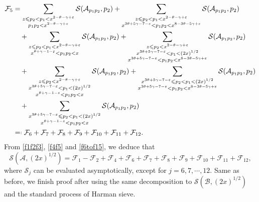 \documentclass[12pt, reqno, twoside, letterpaper]{amsart}
\numberwithin{equation}{section}
\newcommand{\cA}{\ensuremath{\mathcal{A}}}
\newcommand{\cB}{\ensuremath{\mathcal{B}}}
\newcommand{\cF}{\ensuremath{\mathcal{F}}}
\newcommand{\cS}{\ensuremath{\mathcal{S}}}
\theoremstyle{customthm}
\theoremstyle{customrem}
\newcommand*{\eqdef}{=\mathrel{\vcenter{\baselineskip0.5ex \lineskiplimit0pt
			\hbox{\scriptsize.}\hbox{\scriptsize.}}}%
}
\begin{document}
\begin{align}\label{f6tof15}
\nonumber	\cF_5 &= \sum_{\substack{z \leqslant p_2 < p_1 < x^{2-\theta-\gamma+\varepsilon} \\ p_1p_2 < x^{2-\theta-\gamma+\varepsilon}}} \cS(\cA_{p_1p_2},p_2)+ \sum_{\substack{z \leqslant p_2 < p_1 < x^{2-\theta-\gamma+\varepsilon} \\  x^{3\theta+5\gamma-7-\varepsilon} < p_1p_2 < x^{8-3\theta-5\gamma+\varepsilon}}} \cS(\cA_{p_1p_2},p_2) \\
\nonumber &\quad + \sum_{\substack{z \leqslant p_2 < p_1 < x^{2-\theta-\gamma+\varepsilon} \\ x^{\theta+\gamma-1-\varepsilon} < p_1p_2 < x}} \cS(\cA_{p_1p_2},p_2) + \sum_{\substack{z \leqslant p_2 < x^{2-\theta-\gamma+\varepsilon} \\ x^{3\theta+5\gamma-7-\varepsilon} < p_1 < (2x)^{1/2} \\ x^{3\theta+5\gamma-7-\varepsilon} < p_1p_2 < x^{8-3\theta-5\gamma+\varepsilon}}} \cS(\cA_{p_1p_2},p_2) \\
\nonumber &\quad + \sum_{\substack{z \leqslant p_2 < x^{2-\theta-\gamma+\varepsilon} \\ x^{3\theta+5\gamma-7-\varepsilon} < p_1 < (2x)^{1/2} \\ x^{\theta+\gamma-1-\varepsilon} < p_1p_2 < x}} \cS(\cA_{p_1p_2},p_2) + \sum_{\substack{x^{3\theta+5\gamma-7-\varepsilon} \leqslant p_2 < p_1 < (2x)^{1/2} \\ x^{3\theta+5\gamma-7-\varepsilon} < p_1p_2 < x^{8-3\theta-5\gamma+\varepsilon}}} \cS(\cA_{p_1p_2},p_2)\\ 
\nonumber &\quad + \sum_{\substack{x^{3\theta+5\gamma-7-\varepsilon} \leqslant p_2 < p_1 < (2x)^{1/2} \\ x^{\theta+\gamma-1-\varepsilon} < p_1p_2 < x}} \cS(\cA_{p_1p_2},p_2) \\
&\eqdef \cF_6 + \cF_7 +\cF_8+\cF_9+\cF_{10}+\cF_{11}+\cF_{12}.
\end{align}
From \eqref{f1f2f3}, \eqref{f4f5} and \eqref{f6tof15}, we deduce that
$$
\cS(\cA,(2x)^{1/2}) = \cF_1 - \cF_2 + \cF_4 + \cF_6 + \cF_7 +\cF_8+\cF_9+\cF_{10}+\cF_{11}+\cF_{12},
$$
where $\cS_j$ can be evaluated asymptotically, except for $j=6,7, \cdots,12$. Same as before, we finish proof after using the same decomposition to $\cS(\cB,(2x)^{1/2})$ and the standard process of Harman sieve. 
\end{document}
